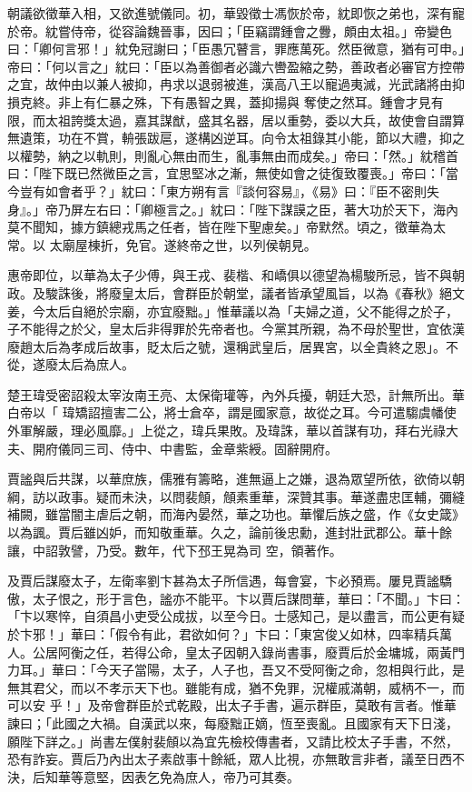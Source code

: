 \begin{pinyinscope}
 朝議欲徵華入相，又欲進號儀同。初，華毀徵士馮恢於帝，紞即恢之弟也，深有寵於帝。紞嘗侍帝，從容論魏晉事，因曰；「臣竊謂鍾會之釁，頗由太祖。」帝變色曰：「卿何言邪！」紞免冠謝曰；「臣愚冗瞽言，罪應萬死。然臣微意，猶有可申。」帝曰：「何以言之」紞曰：「臣以為善御者必識六轡盈縮之勢，善政者必審官方控帶之宜，故仲由以兼人被抑，冉求以退弱被進，漢高八王以寵過夷滅，光武諸將由抑損克終。非上有仁暴之殊，下有愚智之異，蓋抑揚與
 奪使之然耳。鍾會才見有限，而太祖誇獎太過，嘉其謀猷，盛其名器，居以重勢，委以大兵，故使會自謂算無遺策，功在不賞，輈張跋扈，遂構凶逆耳。向令太祖錄其小能，節以大禮，抑之以權勢，納之以軌則，則亂心無由而生，亂事無由而成矣。」帝曰：「然。」紞稽首曰：「陛下既已然微臣之言，宜思堅冰之漸，無使如會之徒復致覆喪。」帝曰：「當今豈有如會者乎？」紞曰：「東方朔有言『談何容易』，《易》曰：『臣不密則失身』。」帝乃屏左右曰：「卿極言之。」紞曰：「陛下謀謨之臣，著大功於天下，海內莫不聞知，據方鎮總戎馬之任者，皆在陛下聖慮矣。」帝默然。頃之，徵華為太常。以
 太廟屋棟折，免官。遂終帝之世，以列侯朝見。



 惠帝即位，以華為太子少傅，與王戎、裴楷、和嶠俱以德望為楊駿所忌，皆不與朝政。及駿誅後，將廢皇太后，會群臣於朝堂，議者皆承望風旨，以為《春秋》絕文姜，今太后自絕於宗廟，亦宜廢黜。」惟華議以為「夫婦之道，父不能得之於子，子不能得之於父，皇太后非得罪於先帝者也。今黨其所親，為不母於聖世，宜依漢廢趙太后為孝成后故事，貶太后之號，還稱武皇后，居異宮，以全貴終之恩」。不從，遂廢太后為庶人。



 楚王瑋受密詔殺太宰汝南王亮、太保衛瓘等，內外兵擾，朝廷大恐，計無所出。華白帝以「
 瑋矯詔擅害二公，將士倉卒，謂是國家意，故從之耳。今可遣騶虞幡使外軍解嚴，理必風靡。」上從之，瑋兵果敗。及瑋誅，華以首謀有功，拜右光祿大夫、開府儀同三司、侍中、中書監，金章紫綬。固辭開府。



 賈謐與后共謀，以華庶族，儒雅有籌略，進無逼上之嫌，退為眾望所依，欲倚以朝綱，訪以政事。疑而未決，以問裴頠，頠素重華，深贊其事。華遂盡忠匡輔，彌縫補闕，雖當闇主虐后之朝，而海內晏然，華之功也。華懼后族之盛，作《女史箴》以為諷。賈后雖凶妒，而知敬重華。久之，論前後忠勳，進封壯武郡公。華十餘讓，中詔敦譬，乃受。數年，代下邳王晃為司
 空，領著作。



 及賈后謀廢太子，左衛率劉卞甚為太子所信遇，每會宴，卞必預焉。屢見賈謐驕傲，太子恨之，形于言色，謐亦不能平。卞以賈后謀問華，華曰：「不聞。」卞曰：「卞以寒悴，自須昌小吏受公成拔，以至今日。士感知己，是以盡言，而公更有疑於卞邪！」華曰：「假令有此，君欲如何？」卞曰：「東宮俊乂如林，四率精兵萬人。公居阿衡之任，若得公命，皇太子因朝入錄尚書事，廢賈后於金墉城，兩黃門力耳。」華曰：「今天子當陽，太子，人子也，吾又不受阿衡之命，忽相與行此，是無其君父，而以不孝示天下也。雖能有成，猶不免罪，況權戚滿朝，威柄不一，而可以安
 乎！」及帝會群臣於式乾殿，出太子手書，遍示群臣，莫敢有言者。惟華諫曰；「此國之大禍。自漢武以來，每廢黜正嫡，恆至喪亂。且國家有天下日淺，願陛下詳之。」尚書左僕射裴頠以為宜先檢校傳書者，又請比校太子手書，不然，恐有詐妄。賈后乃內出太子素啟事十餘紙，眾人比視，亦無敢言非者，議至日西不決，后知華等意堅，因表乞免為庶人，帝乃可其奏。




\end{pinyinscope}
